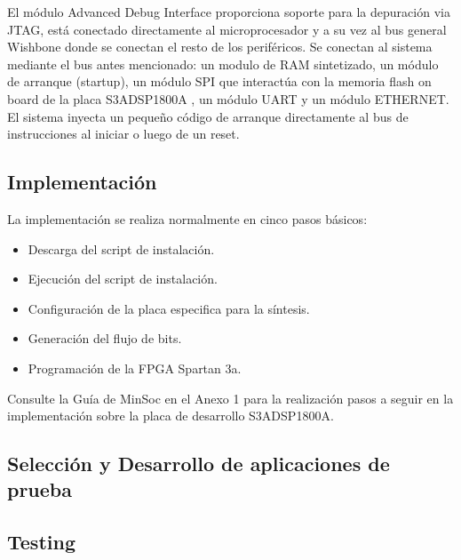 		El módulo Advanced Debug Interface proporciona soporte para la depuración via JTAG, está conectado directamente al microprocesador y a su vez al bus
		general Wishbone donde se conectan el resto de los periféricos. Se conectan al sistema mediante el bus antes mencionado: un modulo	de RAM
		sintetizado, un módulo de arranque (startup), un módulo SPI que interactúa con la memoria flash on board de la placa S3ADSP1800A , un módulo UART y
		un módulo ETHERNET. El sistema inyecta un pequeño código de arranque directamente al bus de instrucciones al iniciar o luego de un reset. 

\newpage
			
		\subsection{Implementación}

La implementación se realiza normalmente en cinco pasos básicos: 
\begin {itemize}
\item Descarga del script de instalación.
\item Ejecución del script de instalación.
\item Configuración de la placa especifica para la síntesis.
\item Generación del flujo de bits.
\item Programación de la FPGA Spartan 3a.
 \end {itemize}
 Consulte la Guía de MinSoc en el Anexo 1 para la realización pasos a seguir en la implementación sobre la placa de desarrollo  S3ADSP1800A.


		

		\subsection{Selección y Desarrollo de aplicaciones de prueba}



		\subsection{Testing}



